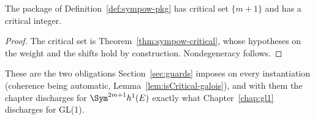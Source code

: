 \begin{lemma}
  \label{lem:sympow-pkg-obligations}
  The package of Definition~\ref{def:sympow-pkg} has critical set $\{m+1\}$ and has a
  critical integer.
\end{lemma}
\begin{proof}
  The critical set is Theorem~\ref{thm:sympow-critical}, whose hypotheses on the weight and the
  shifts hold by construction. Nondegeneracy follows.
\end{proof}

These are the two obligations Section~\ref{sec:guards} imposes on every instantiation
(coherence being automatic, Lemma~\ref{lem:isCritical-galois}), and with them the chapter
discharges
for $\Sym^{2m+1}h^{1}(E)$ exactly what Chapter~\ref{chap:gl1} discharges for GL(1).

